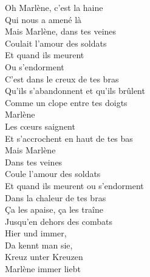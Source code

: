 Oh Marlène, c'est la haine\\
Qui nous a amené là\\
Mais Marlène, dans tes veines\\
Coulait l'amour des soldats\\
Et quand ils meurent\\
Ou s'endorment\\
C'est dans le creux de tes bras\\
Qu'ils s'abandonnent et qu'ils brûlent\\
Comme un clope entre tes doigts\\
Marlène\\
Les cœurs saignent\\
Et s'accrochent en haut de tes bas\\
Mais Marlène\\
Dans tes veines\\
Coule l'amour des soldats\\
Et quand ils meurent ou s'endorment\\
Dans la chaleur de tes bras\\
Ça les apaise, ça les traîne\\
Jusqu'en dehors des combats\\
Hier und immer,\\
Da kennt man sie,\\
Kreuz unter Kreuzen\\
Marlène immer liebt\\
